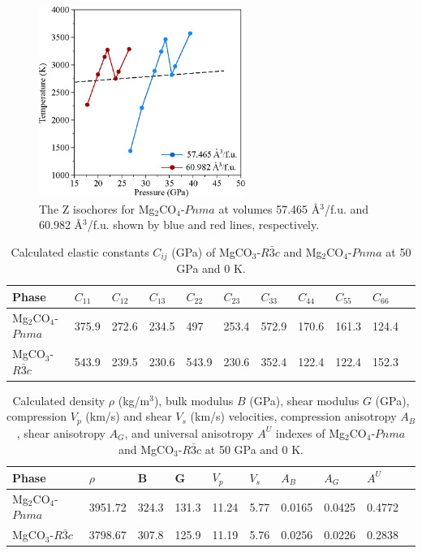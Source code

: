 \documentclass[a4paperm]{article}
\begin{document}
\begin{figure}[H]
	\includegraphics[width=0.6\textwidth]{Zcurve} \centering
	\caption{The Z isochores for Mg$_2$CO$_4$-$Pnma$ at volumes 57.465 \AA{$^3$}/f.u. and 60.982 \AA{$^3$}/f.u. shown by blue and red lines, respectively.} \label{Zcurve}
\end{figure}

	\begin{table}[H]
	\caption{Calculated elastic constants $C_{ij}$ (GPa) of MgCO$_3$-$R\bar{3}c$ and Mg$_2$CO$_4$-$Pnma$ at 50 GPa and 0 K.} \label{elastic_const} \vspace{2mm} 
	\begin{tabular}{l*{10}{l}}
		\hline \hline
Phase	&	$C_{11}$	&	$C_{12}$	&	$C_{13}$	&	$C_{22}$	&	$C_{23}$	&	$C_{33}$	&	$C_{44}$	&	$C_{55}$	&	$C_{66}$	\\
\hline
Mg$_2$CO$_4$-$Pnma$	&	375.9	&	272.6	&	234.5	&	497	&	253.4	&	572.9	&	170.6	&	161.3	&	124.4	\\                                                                                              
MgCO$_3$-$R\bar{3}c$	&	543.9	&	239.5	&	230.6	&	543.9	&	230.6	&	352.4	&	122.4	&	122.4	&	152.3	\\

		\hline \hline
	\end{tabular}
\end{table}

	\begin{table}[H]
	\caption{Calculated density $\rho$ (kg/m$^3$), bulk modulus $B$ (GPa), shear modulus $G$ (GPa), compression $V_p$ (km/s) and shear $V_s$ (km/s) velocities, compression anisotropy $A_B$, shear anisotropy $A_G$, and universal anisotropy $A^U$ indexes of Mg$_2$CO$_4$-$Pnma$ and MgCO$_3$-$R\bar{3}c$ at 50 GPa and 0 K.} \vspace{2mm} \label{moduli}
		\begin{tabular}{l*{9}{l}}
			\hline \hline
					
			Phase	& $\rho$	& B &	G	& $V_p$&  $V_s$ &	$A_B$	&	$A_G$	&	$A^U$	\\
			\hline
			Mg$_2$CO$_4$-$Pnma$	& 3951.72 &	324.3	&	131.3	& 11.24  & 5.77 &	0.0165	&	0.0425	&	0.4772	\\
			MgCO$_3$-$R\bar{3}c$ & 3798.67 &	307.8	&	125.9	& 11.19 & 5.76	&   0.0256	&	0.0226	&	0.2838	\\
			
			\hline \hline
	\end{tabular}
\end{table}
\end{document}
